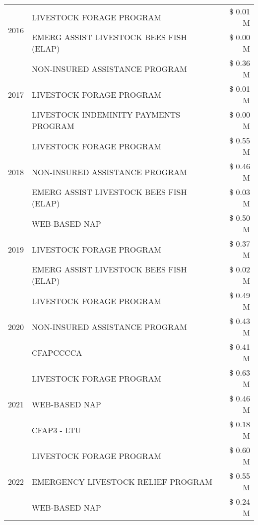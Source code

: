\begin{tabular}{llr}
\cline{1-3}
\multirow[t]{2}{*}{2016} & LIVESTOCK FORAGE PROGRAM & \$ 0.01 M \\
 & EMERG ASSIST LIVESTOCK BEES FISH (ELAP) & \$ 0.00 M \\
\cline{1-3}
\multirow[t]{3}{*}{2017} & NON-INSURED ASSISTANCE PROGRAM & \$ 0.36 M \\
 & LIVESTOCK FORAGE PROGRAM & \$ 0.01 M \\
 & LIVESTOCK INDEMINITY PAYMENTS PROGRAM & \$ 0.00 M \\
\cline{1-3}
\multirow[t]{3}{*}{2018} & LIVESTOCK FORAGE PROGRAM & \$ 0.55 M \\
 & NON-INSURED ASSISTANCE PROGRAM & \$ 0.46 M \\
 & EMERG ASSIST LIVESTOCK BEES FISH (ELAP) & \$ 0.03 M \\
\cline{1-3}
\multirow[t]{3}{*}{2019} & WEB-BASED NAP & \$ 0.50 M \\
 & LIVESTOCK FORAGE PROGRAM & \$ 0.37 M \\
 & EMERG ASSIST LIVESTOCK BEES FISH (ELAP) & \$ 0.02 M \\
\cline{1-3}
\multirow[t]{3}{*}{2020} & LIVESTOCK FORAGE PROGRAM & \$ 0.49 M \\
 & NON-INSURED ASSISTANCE PROGRAM & \$ 0.43 M \\
 & CFAPCCCCA & \$ 0.41 M \\
\cline{1-3}
\multirow[t]{3}{*}{2021} & LIVESTOCK FORAGE PROGRAM & \$ 0.63 M \\
 & WEB-BASED NAP & \$ 0.46 M \\
 & CFAP3 - LTU & \$ 0.18 M \\
\cline{1-3}
\multirow[t]{3}{*}{2022} & LIVESTOCK FORAGE PROGRAM & \$ 0.60 M \\
 & EMERGENCY LIVESTOCK RELIEF PROGRAM & \$ 0.55 M \\
 & WEB-BASED NAP & \$ 0.24 M \\
\cline{1-3}
\bottomrule
\end{tabular}
